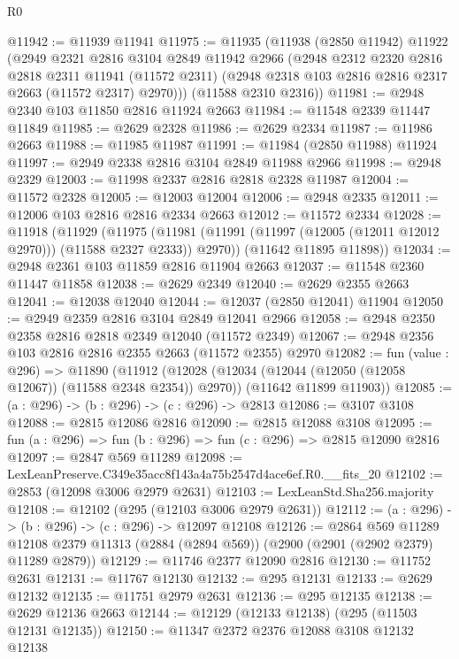 \begin{lexlean}{R0}
\begin{coremodule}
@11942 := @11939 @11941
@11975 := @11935
    (@11938
      (@2850 @11942)
      @11922
      (@2949
        @2321
        @2816
        @3104
        @2849
        @11942
        @2966
        (@2948
          @2312
          @2320
          @2816
          @2818
          @2311
          @11941
          (@11572 @2311)
          (@2948 @2318 @103 @2816 @2816 @2317 @2663 (@11572 @2317) @2970)))
      (@11588 @2310 @2316))
@11981 := @2948 @2340 @103 @11850 @2816 @11924 @2663
@11984 := @11548 @2339 @11447 @11849
@11985 := @2629 @2328
@11986 := @2629 @2334
@11987 := @11986 @2663
@11988 := @11985 @11987
@11991 := @11984 (@2850 @11988) @11924
@11997 := @2949 @2338 @2816 @3104 @2849 @11988 @2966
@11998 := @2948 @2329
@12003 := @11998 @2337 @2816 @2818 @2328 @11987
@12004 := @11572 @2328
@12005 := @12003 @12004
@12006 := @2948 @2335
@12011 := @12006 @103 @2816 @2816 @2334 @2663
@12012 := @11572 @2334
@12028 := @11918
    (@11929
      (@11975 (@11981 (@11991 (@11997 (@12005 (@12011 @12012 @2970))) (@11588 @2327 @2333)) @2970))
      (@11642 @11895 @11898))
@12034 := @2948 @2361 @103 @11859 @2816 @11904 @2663
@12037 := @11548 @2360 @11447 @11858
@12038 := @2629 @2349
@12040 := @2629 @2355 @2663
@12041 := @12038 @12040
@12044 := @12037 (@2850 @12041) @11904
@12050 := @2949 @2359 @2816 @3104 @2849 @12041 @2966
@12058 := @2948 @2350 @2358 @2816 @2818 @2349 @12040 (@11572 @2349)
@12067 := @2948 @2356 @103 @2816 @2816 @2355 @2663 (@11572 @2355) @2970
@12082 := fun (value : @296) =>
  @11890
    (@11912
      (@12028 (@12034 (@12044 (@12050 (@12058 @12067)) (@11588 @2348 @2354)) @2970))
      (@11642 @11899 @11903))
@12085 := (a : @296) -> (b : @296) -> (c : @296) -> @2813
@12086 := @3107 @3108
@12088 := @2815 @12086 @2816
@12090 := @2815 @12088 @3108
@12095 := fun (a : @296) => fun (b : @296) => fun (c : @296) => @2815 @12090 @2816
@12097 := @2847 @569 @11289
@12098 := LexLeanPreserve.C349e35acc8f143a4a75b2547d4ace6ef.R0.__fits_20
@12102 := @2853 (@12098 @3006 @2979 @2631)
@12103 := LexLeanStd.Sha256.majority
@12108 := @12102 (@295 (@12103 @3006 @2979 @2631))
@12112 := (a : @296) -> (b : @296) -> (c : @296) -> @12097 @12108
@12126 := @2864
    @569
    @11289
    @12108
    @2379
    @11313
    (@2884 (@2894 @569))
    (@2900 (@2901 (@2902 @2379) @11289 @2879))
@12129 := @11746 @2377 @12090 @2816
@12130 := @11752 @2631
@12131 := @11767 @12130
@12132 := @295 @12131
@12133 := @2629 @12132
@12135 := @11751 @2979 @2631
@12136 := @295 @12135
@12138 := @2629 @12136 @2663
@12144 := @12129 (@12133 @12138) (@295 (@11503 @12131 @12135))
@12150 := @11347 @2372 @2376 @12088 @3108 @12132 @12138

\end{coremodule}
\end{lexlean}
